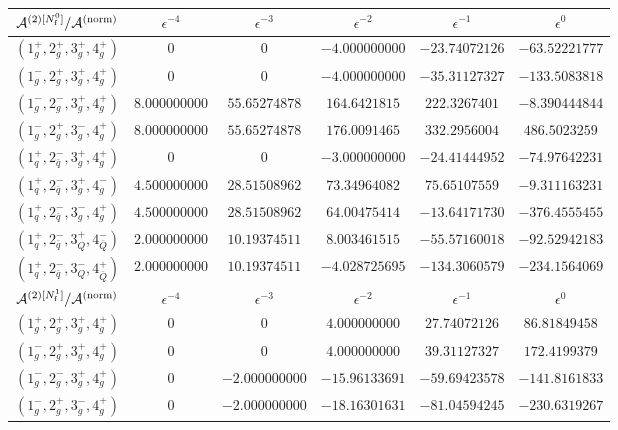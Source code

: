\begin{table}[h]
  \begin{adjustbox}{width=1\textwidth}
    \centering
    \begin{tabular}{cccccc}
      \toprule
      $\mathcal{A}^{(2)[N_\mathrm{f}^0]}/\mathcal{A}^\mathrm{(norm)}$	  &   $\epsilon^{-4}$   &   $\epsilon^{-3}$   &   $\epsilon^{-2}$   &   $\epsilon^{-1}$   &   $\epsilon^{0}$   \\
      \midrule
      $( 1_g^+, 2_g^+, 3_g^+, 4_g^+ )$ & 0 & 0 & $-4.000000000$ & $-23.74072126$ & $-63.52221777$ \\
      $( 1_g^-, 2_g^+, 3_g^+, 4_g^+ )$ & 0 & 0 & $-4.000000000$ & $-35.31127327$ & $-133.5083818$ \\
      $( 1_g^-, 2_g^-, 3_g^+, 4_g^+ )$ & $8.000000000$ & $55.65274878$ & $164.6421815$ & $222.3267401$ & $-8.390444844$ \\
      $( 1_g^-, 2_g^+, 3_g^-, 4_g^+ )$ & $8.000000000$ & $55.65274878$ & $176.0091465$ & $332.2956004$ & $486.5023259$ \\
      \midrule
      $( 1_q^+, 2_{\bar q}^-, 3_g^+, 4_g^+ )$ & 0 & 0 & $-3.000000000$ & $-24.41444952$ & $-74.97642231$ \\
      $( 1_q^+, 2_{\bar q}^-, 3_g^+, 4_g^- )$ & $4.500000000$ & $28.51508962$ & $73.34964082$ & $75.65107559$ & $-9.311163231$ \\
      $( 1_q^+, 2_{\bar q}^-, 3_g^-, 4_g^+ )$ & $4.500000000$ & $28.51508962$ & $64.00475414$ & $-13.64171730$ & $-376.4555455$ \\
      \midrule
      $( 1_q^+, 2_{\bar q}^-, 3_Q^+, 4_{\bar Q}^- )$ & $2.000000000$ & $10.19374511$ & $8.003461515$ & $-55.57160018$ & $-92.52942183$ \\
      $( 1_q^+, 2_{\bar q}^-, 3_Q^-, 4_{\bar Q}^+ )$ & $2.000000000$ & $10.19374511$ & $-4.028725695$ & $-134.3060579$ & $-234.1564069$ \\
      \toprule
      $\mathcal{A}^{(2)[N_\mathrm{f}^1]}/\mathcal{A}^\mathrm{(norm)}$	  &   $\epsilon^{-4}$   &   $\epsilon^{-3}$   &   $\epsilon^{-2}$   &   $\epsilon^{-1}$   &   $\epsilon^{0}$   \\
      \midrule
      $( 1_g^+, 2_g^+, 3_g^+, 4_g^+ )$ & 0 & 0 & $4.000000000$ & $27.74072126$ & $86.81849458$ \\
      $( 1_g^-, 2_g^+, 3_g^+, 4_g^+ )$ & 0 & 0 & $4.000000000$ & $39.31127327$ & $172.4199379$ \\
      $( 1_g^-, 2_g^-, 3_g^+, 4_g^+ )$ & 0 & $-2.000000000$ & $-15.96133691$ & $-59.69423578$ & $-141.8161833$ \\
      $( 1_g^-, 2_g^+, 3_g^-, 4_g^+ )$ & 0 & $-2.000000000$ & $-18.16301631$ & $-81.04594245$ & $-230.6319267$ \\

\end{tabular}
\end{adjustbox}
\end{table}
